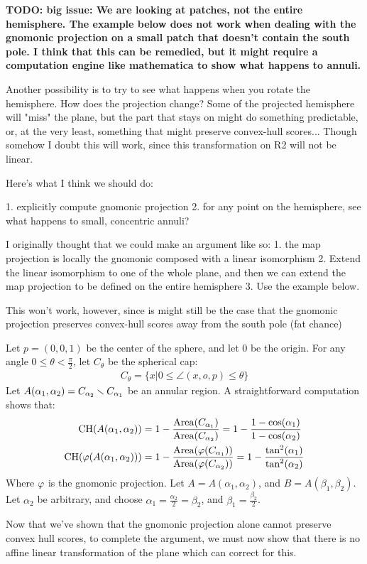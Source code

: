{\bf
TODO: big issue: We are looking at patches, not the entire hemisphere. 
The example below does not work when dealing with the gnomonic 
projection on a small patch that doesn't contain the south pole. 
I think that this can be remedied, but it might require a 
computation engine like mathematica to show what happens to annuli. 

Another possibility is to try to see what happens when you rotate 
the hemisphere. How does the projection change? Some of the projected 
hemisphere will "miss" the plane, but the part that stays on might do 
something predictable, or, at the very least, something that might 
preserve convex-hull scores... Though somehow I doubt this will work, 
since this transformation on R2 will not be linear.

Here's what I think we should do:

1. explicitly compute gnomonic projection
2. for any point on the hemisphere, see what happens to small, 
concentric annuli?

I originally thought that we could make an argument like so:
1. the map projection is locally the gnomonic composed with a linear 
isomorphism
2. Extend the linear isomorphism to one of the whole plane, and then 
we can extend the map projection to be defined on the entire hemisphere
3. Use the example below.

This won't work, however, since is might still be the case that 
the gnomonic projection preserves convex-hull scores away from the 
south pole (fat chance)
}
\begin{example}
  Let $p = (0,0,1)$ be the center of the sphere, and let $0$ be the
  origin. For any angle $0\le \theta< \frac\pi2$, let $C_\theta$ be
  the spherical cap:
  \begin{align*}
    C_{\theta} = \{x|0\le\angle(x,o,p)\le \theta\}
  \end{align*}
  Let $A(\alpha_1,\alpha_2) = C_{\alpha_2}\smallsetminus C_{\alpha_1}$ be 
  an annular region. A straightforward computation shows that:
  \begin{align*}
    \mathrm{CH}(A(\alpha_1,\alpha_2)) &= 
    1-\frac{\mathrm{Area}(C_{\alpha_1})}{\mathrm{Area}(C_{\alpha_2})}
    =1- \frac{1-\cos(\alpha_1)}{1-\cos(\alpha_2)}\\
    \mathrm{CH}(\vphi(A(\alpha_1,\alpha_2))) &=
    1-\frac{\mathrm{Area}(\vphi(C_{\alpha_1}))}%
    {\mathrm{Area}(\vphi(C_{\alpha_2}))}
      =1- \frac{\tan^2(\alpha_1)}{\tan^2(\alpha_2)}
  \end{align*}
  Where $\varphi$ is the gnomonic projection. 
  Let $A=A(\alpha_1,\alpha_2)$, and $B = A(\beta_1,\beta_2)$. 
  Let $\alpha_2$ be arbitrary, and choose 
  $\alpha_1 = \frac{\alpha_2}{2} = \beta_2$, and 
  $\beta_1 = \frac{\beta_2}{2}$. 
  
\end{example}
Now that we've shown that the gnomonic projection alone cannot
preserve convex hull scores, to complete the argument, we must now
show that there is no affine linear transformation of the plane which
can correct for this.

